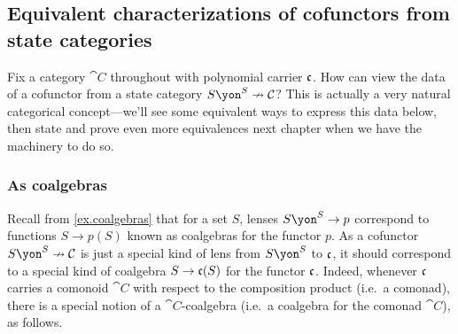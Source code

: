 \documentclass[Book-Poly]{subfiles}
\begin{document}
\subsection{Equivalent characterizations of cofunctors from state categories} \label{sec.comon.sharp.cof.from_state}

Fix a category $\cat{C}$ throughout with polynomial carrier $\mathfrak{c}$.
How can view the data of a cofunctor from a state category $S\yon^S\cof\cat{C}$?
This is actually a very natural categorical concept---we'll see some equivalent ways to express this data below, then state and prove even more equivalences next chapter when we have the machinery to do so.

\subsubsection{As coalgebras}

Recall from \cref{ex.coalgebras} that for a set $S$, lenses $S\yon^S\to p$ correspond to functions $S\to p(S)$ known as coalgebras for the functor $p$.
As a cofunctor $S\yon^S\cof\cat{C}$ is just a special kind of lens from $S\yon^S$ to $\mathfrak{c}$, it should correspond to a special kind of coalgebra $S\to\mathfrak{c}(S)$ for the functor $\mathfrak{c}$.
Indeed, whenever $\mathfrak{c}$ carries a comonoid $\cat{C}$ with respect to the composition product (i.e.\ a comonad), there is a special notion of a $\cat{C}$-coalgebra (i.e.\ a coalgebra for the comonad $\cat{C}$), as follows.
\end{document}
